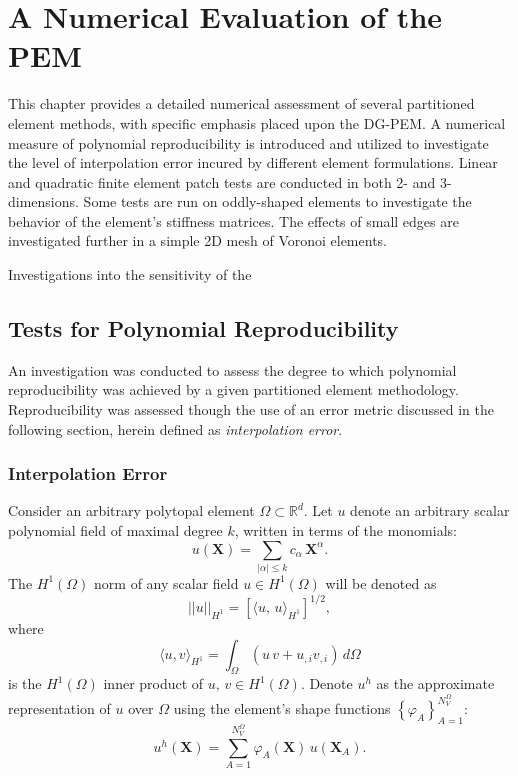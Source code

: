 \chapter{A Numerical Evaluation of the PEM} \label{ch:results}
%
This chapter provides a detailed numerical assessment of several partitioned element methods, with specific emphasis placed upon the DG-PEM. A numerical measure of polynomial reproducibility is introduced and utilized to investigate the level of interpolation error incured by different element formulations. Linear and quadratic finite element patch tests are conducted in both 2- and 3-dimensions. Some tests are run on oddly-shaped elements to investigate the behavior of the element's stiffness matrices. The effects of small edges are investigated further in a simple 2D mesh of Voronoi elements.

 Investigations into the sensitivity of the 

\section{Tests for Polynomial Reproducibility}

An investigation was conducted to assess the degree to which polynomial reproducibility was achieved by a given partitioned element methodology. Reproducibility was assessed though the use of an error metric discussed in the following section, herein defined as \textit{interpolation error}.

\subsection*{Interpolation Error}

Consider an arbitrary polytopal element $\Omega \subset \mathbb{R}^d$. Let $u$ denote an arbitrary scalar polynomial field of maximal degree $k$, written in terms of the monomials:
\begin{equation}
        u (\mathbf{X}) = \sum_{|\alpha| \leq k} c_{\alpha} \, \mathbf{X}^{\alpha}.
\end{equation}
The $H^1(\Omega)$ norm of any scalar field $u \in H^1(\Omega)$ will be denoted as
\begin{equation}
        ||u||_{H^1} = \left[ \langle u, \, u \rangle_{H^1} \right]^{1/2},
\end{equation}
where
\begin{equation}
       \langle u,v \rangle_{H^1} = \int_{\Omega} (u \, v + u_{,i} v_{,i}) \, d\Omega
\end{equation}
is the $H^1(\Omega)$ inner product of $u, \,v \in H^1(\Omega)$. Denote $u^h$ as the approximate representation of $u$ over $\Omega$ using the element's shape functions $\left\{ \varphi_A \right\}_{A=1}^{N^\Omega_V}$:
\begin{equation}
        u^h (\mathbf{X}) = \sum_{A = 1}^{N^{\Omega}_V} \varphi_A (\mathbf{X}) \, u(\mathbf{X}_A).
\end{equation}

